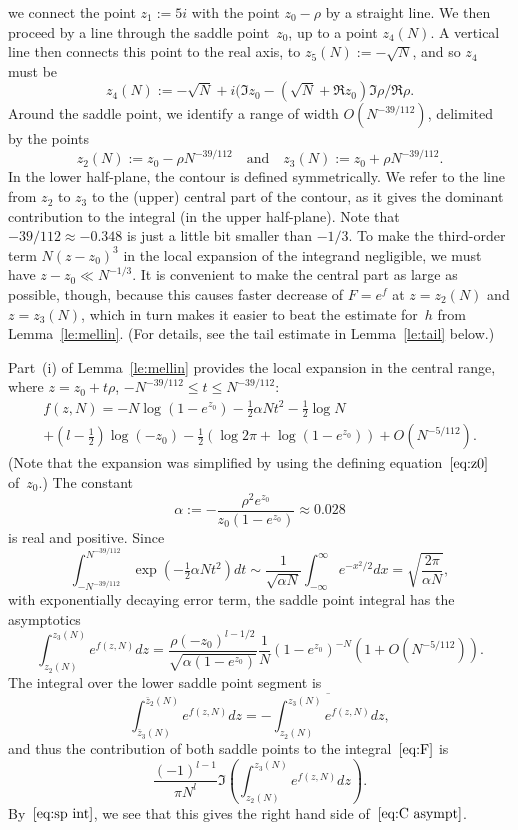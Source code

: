 \documentclass[a4paper]{amsart}
\begin{document}
we connect the point $z_1:=5i$ with the point $ z_0-\rho$ by a straight line. We then proceed by a
line through the saddle point~$z_0$,
up to a point $z_4(N)$. A vertical line then connects this point to the real
axis, to $z_5(N):=-\sqrt{N}$, and so $z_4$ must be
\[
  z_4(N) := -\sqrt{N} + i (\Im z_0-(\sqrt{N}+\Re z_0) \Im \rho / \Re \rho.
\]
Around the saddle point, we identify a range of width $O(N^{-39/112})$,
delimited by the points
\[
  z_2(N):=z_0-\rho N^{-39/112} \quad \text{and} \quad
  z_3(N):=z_0+\rho N^{-39/112}.
\]
In the lower half-plane, the contour is defined symmetrically.
We refer to the line from $z_2$ to $z_3$ to the (upper) central part
of the contour, as it gives the dominant contribution to the
integral (in the upper half-plane).
Note that $-39/112\approx -0.348$ is just a little bit smaller than $-1/3$.
To make the third-order term $N(z-z_0)^3$ in the local expansion of the integrand
negligible, we must have $z-z_0 \ll N^{-1/3}$. It is convenient
to make the central part as large as possible, though, because
this causes faster decrease of $F=e^f$ at $z=z_2(N)$
and $z=z_3(N)$, which
in turn makes it easier to beat the estimate for~$h$ from Lemma~\ref{le:mellin}.
(For details, see the tail estimate in Lemma~\ref{le:tail} below.)

Part~(i) of Lemma~\ref{le:mellin} provides the local
expansion in the central range, where $z=z_0+t\rho$,
$-N^{-39/112}\leq t \leq N^{-39/112}$:
\begin{multline}\label{eq:loc expans}
  f(z,N) = - N \log(1 -e^{z_0}) -\tfrac12 \alpha N t^2 - \tfrac12 \log N \\
     + (l-\tfrac12)\log(-z_0) -\tfrac12 (\log2\pi +\log(1-e^{z_0}))
      + O(N^{-5/112}).
\end{multline}
(Note that the expansion was simplified by using the defining equation~$\ref{eq:z0}$
of~$z_0$.) The constant
\[
  \alpha := -\frac{\rho^2e^{z_0}} {z_0(1-e^{z_0})} \approx 0.028
\]
is real and positive. Since
\[
  \int_{-N^{-39/112}}^{N^{-39/112}}\exp(-\tfrac12 \alpha N t^2)dt
  \sim \frac{1}{\sqrt{\alpha N}}\int_{-\infty}^{\infty}e^{-x^2/2}dx
  = \sqrt{\frac{2\pi}{\alpha N}},
\]
with exponentially decaying error term,
the saddle point integral has the asymptotics
\begin{equation}\label{eq:sp int}
  \int_{z_2(N)}^{z_3(N)} e^{f(z,N)}dz =
  \frac{\rho(-z_0)^{l-1/2}}{ \sqrt{\alpha(1-e^{z_0})}}
  \frac1N (1-e^{z_0})^{-N}(1+O(N^{-5/112})).
\end{equation}
The integral over the lower saddle point segment is
\[
  \int_{\bar{z}_3(N)}^{\bar{z}_2(N)}e^{f(z,N)}dz =
    - \overline{\int_{z_2(N)}^{z_3(N)} e^{f(z,N)}dz},
\]
and thus the contribution of both saddle points to the integral~$\ref{eq:F}$
is
\[
   \frac{(-1)^{l-1}}{\pi N^l} \Im \left(
     \int_{z_2(N)}^{z_3(N)} e^{f(z,N)}dz \right).
\]
By~$\ref{eq:sp int}$, we see that this gives the right hand
side of~$\ref{eq:C asympt}$.
\end{document}
